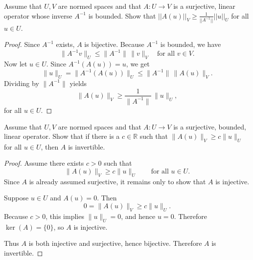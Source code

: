 \begin{prob}
    Assume that $U,V$ are normed spaces and that $A : U \to V$ 
    is a surjective, linear operator whose inverse $A^{-1}$ 
    is bounded. Show that $||A(u)||_V \geq \frac{1}{||A^{-1}||}
    ||u||_U$ for all $u \in U$.
\end{prob}
\begin{proof}
    Since $A^{-1}$ exists, $A$ is bijective. Because $A^{-1}$ is 
    bounded, we have
    \[
        \|A^{-1}v\|_U \le \|A^{-1}\|\,\|v\|_V
        \quad \text{for all } v \in V.
    \]
    Now let $u \in U$. Since $A^{-1}(A(u)) = u$, we get
    \[
        \|u\|_U
        =
        \|A^{-1}(A(u))\|_U
        \le
        \|A^{-1}\|\,\|A(u)\|_V.
    \]
    Dividing by $\|A^{-1}\|$ yields
    \[
        \|A(u)\|_V \ge \frac{1}{\|A^{-1}\|}\,\|u\|_U,
    \]
    for all $u \in U$.
\end{proof}
\begin{prob}
    Assume that $U,V$ are normed spaces and that $A : U \to V$
    is a surjective, bounded, linear operator. Show that if 
    there is a $c \in \mathbb R$ such that $\|A(u)\|_V \ge c\|u\|_U$
    for all $u \in U$, then $A$ is invertible.
\end{prob}
\begin{proof}
    Assume there exists $c>0$ such that
    \[
        \|A(u)\|_V \ge c\|u\|_U
        \qquad \text{for all } u\in U.
    \]
    Since $A$ is already assumed surjective, it remains only 
    to show that
    $A$ is injective.

    Suppose $u\in U$ and $A(u)=0$. Then
    \[
        0=\|A(u)\|_V \ge c\|u\|_U.
    \]
    Because $c>0$, this implies $\|u\|_U=0$, and hence $u=0$.
    Therefore $\ker(A)=\{0\}$, so $A$ is injective.

    Thus $A$ is both injective and surjective, hence bijective. 
    Therefore
    $A$ is invertible.
\end{proof}
